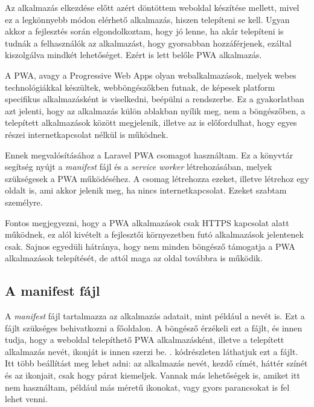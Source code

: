 \documentclass[
]{thesis-ekf}
\theoremstyle{definition}
\theoremstyle{remark}
\begin{document}
Az alkalmazás elkezdése előtt azért döntöttem weboldal készítése mellett, mivel ez a legkönnyebb módon elérhető alkalmazás, hiszen telepíteni se kell. Ugyan akkor a fejlesztés során elgondolkoztam, hogy jó lenne, ha akár telepíteni is tudnák a felhasználók az alkalmazást, hogy gyorsabban hozzáférjenek, ezáltal kiszolgálva mindkét lehetőséget. Ezért is lett belőle PWA alkalmazás.

A PWA, avagy a Progressive Web Apps olyan webalkalmazások, melyek webes technológiákkal készültek, webböngészőkben futnak, de képesek platform specifikus alkalmazásként is viselkedni, beépülni a rendszerbe.\cite{PWA} Ez a gyakorlatban azt jelenti, hogy az alkalmazás külön ablakban nyílik meg, nem a böngészőben, a telepített alkalmazások között megjelenik, illetve az is előfordulhat, hogy egyes részei internetkapcsolat nélkül is működnek.

Ennek megvalósításához a Laravel PWA\cite{laravelpwa} csomagot használtam. Ez a könyvtár segítség nyújt a \emph{manifest} fájl és a \emph{service worker} létrehozásában, melyek szükségesek a PWA működéséhez. A csomag létrehozza ezeket, illetve létrehoz egy oldalt is, ami akkor jelenik meg, ha nincs internetkapcsolat. Ezeket szabtam személyre.

Fontos megjegyezni, hogy a PWA alkalmazások csak HTTPS kapcsolat alatt működnek, ez alól kivételt a fejlesztői környezetben futó alkalmazások jelentenek csak. Sajnos egyedüli hátránya, hogy nem minden böngésző támogatja a PWA alkalmazások telepítését, de attól maga az oldal továbbra is működik.

\subsection{A manifest fájl}

A \emph{manifest} fájl tartalmazza az alkalmazás adatait, mint például a nevét is. Ezt a fájlt szükséges behivatkozni a főoldalon. A böngésző érzékeli ezt a fájlt, és innen tudja, hogy a weboldal telepíthető PWA alkalmazásként, illetve a telepített alkalmazás nevét, ikonját is innen szerzi be. . kódrészleten láthatjuk ezt a fájlt. Itt több beállítást meg lehet adni: az alkalmazás nevét, kezdő címét, háttér színét és az ikonjait, csak hogy párat kiemeljek. Vannak más lehetőségek is, amiket itt nem használtam, például más méretű ikonokat, vagy gyors parancsokat is fel lehet venni.


\end{document}
